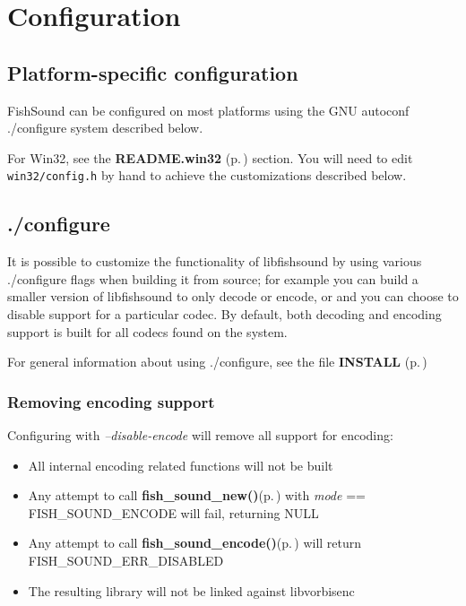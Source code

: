 \section{Configuration}
\label{group__configuration}
\subsection{Platform-specific configuration}\label{group__configuration_platforms}
Fish\-Sound can be configured on most platforms using the GNU autoconf ./configure system described below.

For Win32, see the {\bf README.win32 }{\rm (p.\,\pageref{group__win32})} section. You will need to edit {\tt win32/config.h} by hand to achieve the customizations described below.\subsection{./configure}\label{group__configuration_configure}
It is possible to customize the functionality of libfishsound by using various ./configure flags when building it from source; for example you can build a smaller version of libfishsound to only decode or encode, or and you can choose to disable support for a particular codec. By default, both decoding and encoding support is built for all codecs found on the system.

For general information about using ./configure, see the file {\bf INSTALL }{\rm (p.\,\pageref{group__install})}\subsubsection{Removing encoding support}\label{group__configuration_no_encode}
Configuring with {\em --disable-encode\/} will remove all support for encoding:\begin{itemize}
\item All internal encoding related functions will not be built\item Any attempt to call {\bf fish\_\-sound\_\-new()}{\rm (p.\,\pageref{fishsound_8h_a4})} with {\em mode\/} == FISH\_\-SOUND\_\-ENCODE will fail, returning NULL\item Any attempt to call {\bf fish\_\-sound\_\-encode()}{\rm (p.\,\pageref{fishsound_8h_a8})} will return FISH\_\-SOUND\_\-ERR\_\-DISABLED\item The resulting library will not be linked against libvorbisenc\end{itemize}
